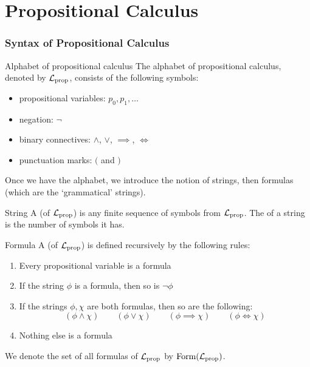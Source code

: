 \documentclass{styles/tufte}
\author{Jiaming (George) Yu}
\date{\today}
\begin{document}
\maketitle
\tableofcontents
\newpage



\part{Propositional Calculus}

\section{Syntax of Propositional Calculus}

\begin{definition}{Alphabet of propositional calculus}{}
  The alphabet of propositional calculus, denoted by $\mathcal{L}_\textrm{prop}$, consists of the following symbols:
  \begin{itemize}
    \item propositional variables: $p_0, p_1, \dots$
    \item negation: $\neg$
    \item binary connectives: $\land$, $\lor$, $\implies$, $\iff$
    \item punctuation marks: $($ and $)$
  \end{itemize}
\end{definition}

Once we have the alphabet, we introduce the notion of strings, then formulas (which are the `grammatical' strings).

\begin{definition}{String}{}
  A  (of $\mathcal{L}_\textrm{prop}$) is any finite sequence of symbols from $\mathcal{L}_\textrm{prop}$. The  of a string is the number of symbols it has.
\end{definition}

\begin{definition}{Formula}{}
  A  (of $\mathcal{L}_\textrm{prop}$) is defined recursively by the following rules:
  \begin{enumerate}
    \item Every propositional variable is a formula
    \item If the string $\phi$ is a formula, then so is $\neg \phi$
    \item If the strings $\phi, \chi$ are both formulas, then so are the following:
    \[ (\phi \land \chi) \qquad
       (\phi \lor \chi) \qquad
       (\phi \implies \chi) \qquad
       (\phi \iff \chi) \]
    \item Nothing else is a formula
  \end{enumerate}
  We denote the set of all formulas of $\mathcal{L}_\textrm{prop}$ by $\operatorname{Form}(\mathcal{L}_\textrm{prop})$.
\end{definition}
\end{document}
